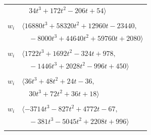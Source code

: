 \documentclass[11pt]{article}
\begin{document}
\begin{longtable}{@{}ll@{}}
 & $\quad 34t^{3}+172t^{2}-206t+54\rangle$\\
\addlinespace[2pt]
\multicolumn{2}{@{}p{0.97\textwidth}@{}}{$i=19$, $D_i=512$, $e_i=0$, $\rho_{ij}$: $3{:}2, \allowbreak 4{:}2, \allowbreak 8{:}1, \allowbreak 28{:}2, \allowbreak 36{:}2, \allowbreak 50{:}1, \allowbreak 52{:}1$}\\
$w_i$ & $\langle 16880t^{3}+58320t^{2}+12960t-23440,$\\
 & $\quad -8000t^{3}+44640t^{2}+59760t+2080\rangle$\\
\addlinespace[2pt]
\multicolumn{2}{@{}p{0.97\textwidth}@{}}{$i=20$, $D_i=8$, $\rho_{ij}$: $2{:}2, \allowbreak 10{:}1, \allowbreak 11{:}1, \allowbreak 22{:}2, \allowbreak 23{:}2, \allowbreak 27{:}2, \allowbreak 31{:}1, \allowbreak 33{:}1, \allowbreak 35{:}2, \allowbreak 36{:}1, \allowbreak 40{:}2, \allowbreak 52{:}1, \allowbreak 55{:}1, \allowbreak 57{:}1, \allowbreak 58{:}2$}\\
$w_i$ & $\langle 1722t^{3}+1692t^{2}-324t+978,$\\
 & $\quad -1446t^{3}+2028t^{2}-996t+450\rangle$\\
\addlinespace[2pt]
\multicolumn{2}{@{}p{0.97\textwidth}@{}}{$i=21$, $D_i=8$, $\rho_{ij}$: $2{:}2, \allowbreak 13{:}1, \allowbreak 22{:}2, \allowbreak 25{:}1, \allowbreak 32{:}1, \allowbreak 34{:}2, \allowbreak 38{:}1, \allowbreak 43{:}2, \allowbreak 48{:}1, \allowbreak 52{:}2, \allowbreak 54{:}1, \allowbreak 58{:}1$}\\
$w_i$ & $\langle 36t^{3}+48t^{2}+24t-36,$\\
 & $\quad 30t^{3}+72t^{2}+36t+18\rangle$\\
\addlinespace[2pt]
\multicolumn{2}{@{}p{0.97\textwidth}@{}}{$i=22$, $D_i=16$, $\rho_{ij}$: $2{:}2, \allowbreak 3{:}2, \allowbreak 4{:}2, \allowbreak 5{:}2, \allowbreak 10{:}2, \allowbreak 11{:}1, \allowbreak 14{:}1, \allowbreak 17{:}1, \allowbreak 20{:}1, \allowbreak 21{:}1, \allowbreak 26{:}1, \allowbreak 40{:}1, \allowbreak 48{:}2, \allowbreak 50{:}2, \allowbreak 52{:}2$}\\
$w_i$ & $\langle -3714t^{3}-827t^{2}+4772t-67,$\\
 & $\quad -381t^{3}-5045t^{2}+2208t+996\rangle$\\
\addlinespace[2pt]
\multicolumn{2}{@{}p{0.97\textwidth}@{}}{$i=23$, $D_i=8$, $\rho_{ij}$: $2{:}1, \allowbreak 8{:}1, \allowbreak 12{:}1, \allowbreak 20{:}1, \allowbreak 25{:}1, \allowbreak 26{:}1, \allowbreak 36{:}2, \allowbreak 49{:}1, \allowbreak 50{:}2, \allowbreak 51{:}1, \allowbreak 56{:}2$}\\

\end{longtable}
\end{document}
